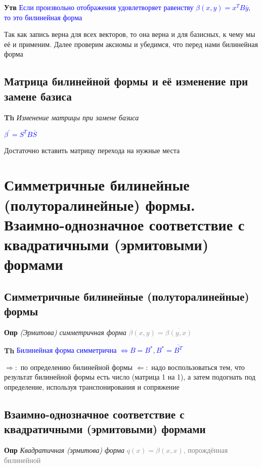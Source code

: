 \documentclass[a4paper, 14pt]{article}
\begin{document}
    \textbf{Утв} \textcolor{blue}{Если произвольно отображения удовлетворяет
    равенству $\beta (x, y) = x^T B \overline{y}$, то это билинейная форма}
    
    Так как запись верна для всех векторов, то она верна и для базисных, к чему мы её и применим.
    Далее проверим аксиомы и убедимся, что перед нами билинейная форма
    
    \subsection{Матрица билинейной формы и её изменение при замене базиса}
    
    \textbf{Th} \textit{Изменение матрицы при замене базиса}
    
    \textcolor{blue}{$\beta^{'} = S^T B \overline{S}$}
    
    Достаточно вставить матрицу перехода на нужные места
    
    \section{Симметричные билинейные (полуторалинейные) формы.
    Взаимно-однозначное соответствие с квадратичными (эрмитовыми) формами}
    
    \subsection{Симметричные билинейные (полуторалинейные) формы}
    
    \textbf{Опр} \textit{(Эрмитова) симметричная форма} \textcolor{gray}{$\beta (x, y) = \overline{\beta (y, x)}$}
    
    \textbf{Th} \textcolor{blue}{Билинейная форма симметрична $\Leftrightarrow B = B^*, B^* = \overline{B^T}$}
    
    $\Rightarrow:$ по определению билинейной формы
    $\Leftarrow:$ надо воспользоваться тем, что результат билинейной формы есть число (матрица 1 на 1), а затем
    подогнать под определение, используя транспонирования и сопряжение
    
    \subsection{Взаимно-однозначное соответствие с квадратичными (эрмитовыми) формами}
    
    \textbf{Опр} \textit{Квадратичная (эрмитова) форма} \textcolor{gray}{$q(x) = \beta (x, x)$, порождённая билинейной}
    
\end{document}
